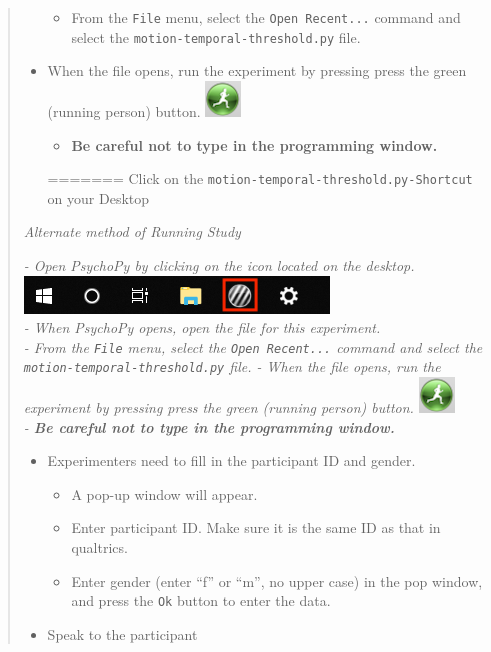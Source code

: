 \documentclass[]{article}
\providecommand{\tightlist}{%
  \setlength{\itemsep}{0pt}\setlength{\parskip}{0pt}}
\begin{document}
\begin{quote}
\begin{itemize}
  \begin{itemize}
  \tightlist
  \item
    From the \texttt{File} menu, select the \texttt{Open\ Recent...}
    command and select the \texttt{motion-temporal-threshold.py} file.
  \end{itemize}
\item
  When the file opens, run the experiment by pressing press the green
  (running person) button. \includegraphics{images/PPrunningMan.png}

  \begin{itemize}
  \tightlist
  \item
    \textbf{Be careful not to type in the programming window.}
  \end{itemize}
=======
  Click on the \texttt{motion-temporal-threshold.py-Shortcut} on your
  Desktop
\end{itemize}

\emph{Alternate method of Running Study}

\emph{- Open PsychoPy by clicking on the icon located on the desktop.
\includegraphics{images/PsychoPy-1.PNG}\\
- When PsychoPy opens, open the file for this experiment.\\
- From the \texttt{File} menu, select the \texttt{Open\ Recent...}
command and select the \texttt{motion-temporal-threshold.py} file. -
When the file opens, run the experiment by pressing press the green
(running person) button. \includegraphics{images/PPrunningMan.png}\\
- \textbf{Be careful not to type in the programming window.}}

\begin{itemize}
\tightlist
>>>>>>> 68c3b652bc9fce1eaa5ec75263380cb3ee4d3281
\item
  Experimenters need to fill in the participant ID and gender.

  \begin{itemize}
  \tightlist
  \item
    A pop-up window will appear.
  \item
    Enter participant ID. Make sure it is the same ID as that in
    qualtrics.
  \item
    Enter gender (enter ``f'' or ``m'', no upper case) in the pop
    window, and press the \texttt{Ok} button to enter the data.
  \end{itemize}
\item
  Speak to the participant
\end{itemize}


\end{quote}
\end{document}
